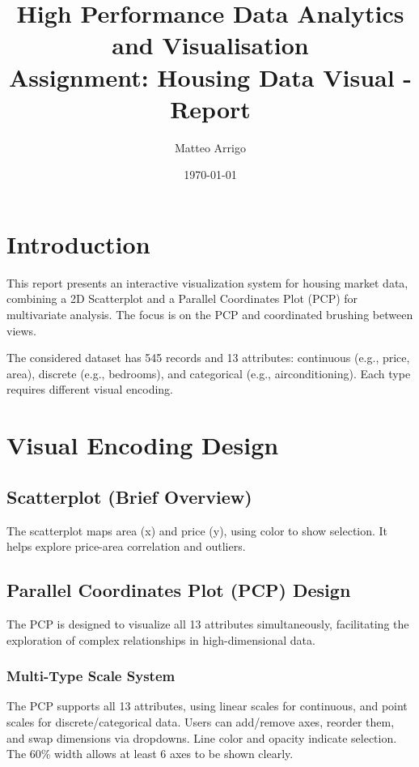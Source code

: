\documentclass[10pt,a4paper]{article}
\title{\textbf{High Performance Data Analytics and Visualisation\\Assignment: Housing Data Visual - Report}}
\author{Matteo Arrigo}
\date{\today}
\begin{document}
\maketitle

\section{Introduction}

This report presents an interactive visualization system for housing market data, combining a 2D Scatterplot and a Parallel Coordinates Plot (PCP) for multivariate analysis. The focus is on the PCP and coordinated brushing between views.

The considered dataset has 545 records and 13 attributes: continuous (e.g., price, area), discrete (e.g., bedrooms), and categorical (e.g., airconditioning). Each type requires different visual encoding.

\section{Visual Encoding Design}

\vspace{-3pt}
\subsection{Scatterplot (Brief Overview)}

The scatterplot maps area (x) and price (y), using color to show selection. It helps explore price-area correlation and outliers.

\vspace{-3pt}
\subsection{Parallel Coordinates Plot (PCP) Design}

The PCP is designed to visualize all 13 attributes simultaneously, facilitating the exploration of complex relationships in high-dimensional data.

\vspace{-3pt}
\subsubsection{Multi-Type Scale System}

The PCP supports all 13 attributes, using linear scales for continuous, and point scales for discrete/categorical data. Users can add/remove axes, reorder them, and swap dimensions via dropdowns. Line color and opacity indicate selection. The 60\% width allows at least 6 axes to be shown clearly.
\end{document}
